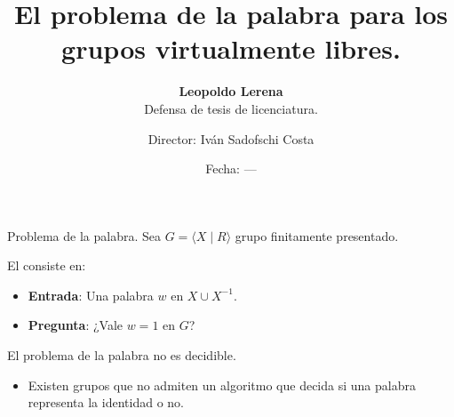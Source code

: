 \documentclass[aspectratio=169, 10pt]{beamer}
\title{El problema de la palabra para los grupos virtualmente libres.}
\subtitle{\textbf{Leopoldo Lerena} \\
		Defensa de tesis de licenciatura.}
\date{Fecha: ---}
\author{Director: Iván Sadofschi Costa}
\institute{Universidad de Buenos Aires}
\begin{document}
	\maketitle

	
	
	
	\begin{frame}[fragile]{Problema de la palabra.}
		Sea $ G = \langle X \mid R \rangle$ grupo finitamente presentado.
		
		\pause 

		El  consiste en:
		\pause 
		\begin{itemize}
					\item 
						\textbf{Entrada}: Una palabra $w$ en $X \cup X^{-1}$.
					\pause 
					\item 
						\textbf{Pregunta}: ¿Vale $w=1$ en $G$?
		\end{itemize}
		\pause 

		El problema de la palabra no es \alert{decidible}.
		\pause 
		\begin{itemize}
			\item 
				Existen grupos que no admiten un algoritmo que decida si una palabra representa la identidad o no.
		\end{itemize}
		
		
	\end{frame}
\end{document}

